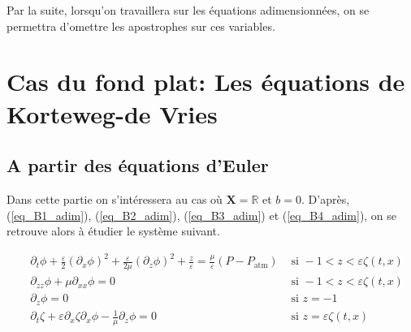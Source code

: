 \documentclass[12pt,a4paper]{article}
\numberwithin{equation}{section}
\begin{document}
Par la suite, lorsqu'on travaillera sur les équations adimensionnées, on se permettra d'omettre les apostrophes sur ces variables.
\newpage
\section{Cas du fond plat: Les équations de Korteweg-de Vries} 
\subsection{A partir des équations d'Euler}
Dans cette partie on s'intéressera au cas où $\textbf{X} = \mathbb{R}$ et $b = 0$. D'après, (\ref{eq_B1_adim}), (\ref{eq_B2_adim}), (\ref{eq_B3_adim}) et (\ref{eq_B4_adim}), on se retrouve alors à étudier le système suivant.

\begin{align}
~&\partial_{t} \phi + 
     \frac{\varepsilon}{2}(\partial_{x}\phi)^2+ \frac{\varepsilon}{2\mu}(\partial_{z}\phi)^2
     + \frac{z}{\varepsilon} 
     = \frac{\mu}{\varepsilon}(P-P_{\text{atm}}) &\text{ si } -1 < z < \varepsilon \zeta(t,x)\\
~&\partial_{zz}\phi + \mu \partial_{x x}\phi  = 0  &\text{ si } -1 < z < \varepsilon \zeta(t,x) \label{eq_k2}\\
~&\partial_{z}\phi = 0&\text{ si } z  = - 1\label{eq_k3}\\
~&\partial_{t}\zeta +  \varepsilon \partial_{x} \zeta  \partial_{x}\phi  - \frac{1}{\mu}\partial_{z}\phi = 0 &\text{ si } z = \varepsilon \zeta(t,x)
\end{align}
\end{document}
